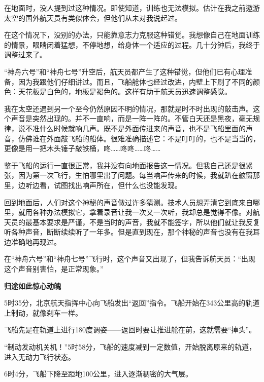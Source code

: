 \documentclass[12pt,UTF-8,openany]{ctexbook}
\begin{document}
\begin{normalsize}
    在地面时，没人提到过这种情况。即使知道，训练也无法模拟。估计在我之前遨游太空的国外航天员有类似体会，但他们从未对我说起过。
    
    在这个情况下，没别的办法，只能靠意志力克服这种错觉。我想像自己在地面训练的情景，眼睛闭着猛想，不停地想，给身体一个适应的过程。几十分钟后，我终于调整过来了。
    
    “神舟六号”和“神舟七号”升空后，航天员都产生了这种错觉，但他们已有心理准备，因为我跟他们仔细讲过。而且，飞船舱体也经过改进，内壁上下刷了不同的颜色：天花板是白色的，地板是褐色的。这样有助于航天员迅速调整感觉。
    
    我在太空还遇到另一个至今仍然原因不明的情况，那就是时不时出现的敲击声。这个声音是突然出现的。并不一直响，而是一阵一阵的。不管白天还是黑夜，毫无规律，说不准什么时候就响几声。既不是外面传进来的声音，也不是飞船里面的声音，仿佛谁在外面敲飞船的船体。很难准确描述它：不是叮叮的，也不是当当的，更像是用一把木头锤子敲铁桶，咚……咚咚……咚……
    
    鉴于飞船的运行一直很正常，我并没有向地面报告这一情况。但我自己还是很紧张，因为第一次飞行，生怕哪里出了问题。每当响声传来的时候，我就趴在舷窗那里，边听边看，试图找出响声所在，但什么也没能发现。
    
    回到地面后，人们对这个神秘的声音做过许多猜测。技术人员想弄清它到底来自哪里，就用各种办法模拟它，拿着录音让我一次又一次听，我却总是觉得不像。对航天员的最基本要求是严谨，不是当时的声音，我就不能签字，所以他们就让我反复听各种声音，断断续续听了一年多。但是直到现在，那个神秘的声音也没有在我耳边准确地再现过。
    
    在“神舟六号”和“神舟七号”飞行时，这个声音又出现了，但我告诉航天员：“出现这个声音别害怕，是正常现象。”
    
    \begin{center}
    
    \begin{large}\textbf{归途如此惊心动魄}\end{large}
    
    \end{center}
    
    5时35分，北京航天指挥中心向飞船发出“返回”指令。飞船开始在343公里高的轨道上制动，就像刹车一样。
    
    飞船先是在轨道上进行180度调姿——返回时要让推进舱在前，这就需要“掉头”。
    
    “制动发动机关机！”5时58分，飞船的速度减到一定数值，开始脱离原来的轨道，进入无动力飞行状态。
    
    6时4分，飞船下降至距地100公里，进入逐渐稠密的大气层。
    

\end{normalsize}
\end{document}
